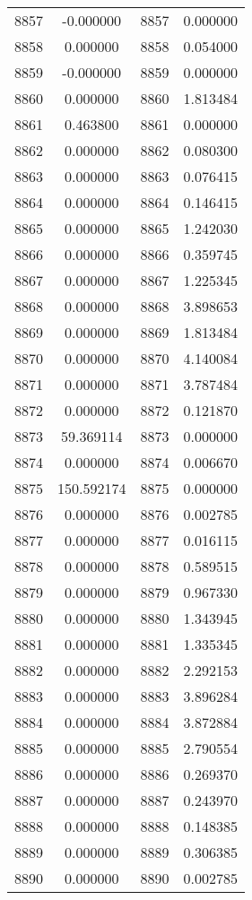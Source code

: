 \documentclass[12pt]{article}
\begin{document}
\begin{longtable}{@{}cccc@{}}
8857 & -0.000000 & 8857 & 0.000000 \\
8858 & 0.000000 & 8858 & 0.054000 \\
8859 & -0.000000 & 8859 & 0.000000 \\
8860 & 0.000000 & 8860 & 1.813484 \\
8861 & 0.463800 & 8861 & 0.000000 \\
8862 & 0.000000 & 8862 & 0.080300 \\
8863 & 0.000000 & 8863 & 0.076415 \\
8864 & 0.000000 & 8864 & 0.146415 \\
8865 & 0.000000 & 8865 & 1.242030 \\
8866 & 0.000000 & 8866 & 0.359745 \\
8867 & 0.000000 & 8867 & 1.225345 \\
8868 & 0.000000 & 8868 & 3.898653 \\
8869 & 0.000000 & 8869 & 1.813484 \\
8870 & 0.000000 & 8870 & 4.140084 \\
8871 & 0.000000 & 8871 & 3.787484 \\
8872 & 0.000000 & 8872 & 0.121870 \\
8873 & 59.369114 & 8873 & 0.000000 \\
8874 & 0.000000 & 8874 & 0.006670 \\
8875 & 150.592174 & 8875 & 0.000000 \\
8876 & 0.000000 & 8876 & 0.002785 \\
8877 & 0.000000 & 8877 & 0.016115 \\
8878 & 0.000000 & 8878 & 0.589515 \\
8879 & 0.000000 & 8879 & 0.967330 \\
8880 & 0.000000 & 8880 & 1.343945 \\
8881 & 0.000000 & 8881 & 1.335345 \\
8882 & 0.000000 & 8882 & 2.292153 \\
8883 & 0.000000 & 8883 & 3.896284 \\
8884 & 0.000000 & 8884 & 3.872884 \\
8885 & 0.000000 & 8885 & 2.790554 \\
8886 & 0.000000 & 8886 & 0.269370 \\
8887 & 0.000000 & 8887 & 0.243970 \\
8888 & 0.000000 & 8888 & 0.148385 \\
8889 & 0.000000 & 8889 & 0.306385 \\
8890 & 0.000000 & 8890 & 0.002785 \\

\end{longtable}
\end{document}

